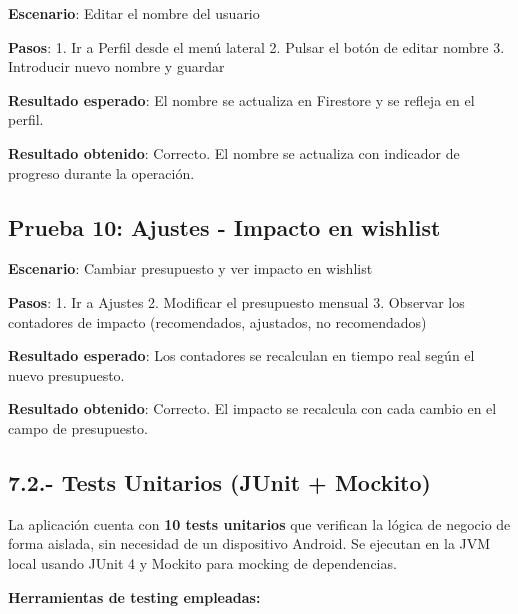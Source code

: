 \documentclass[
  spanish,
  11pt,
  paper=a4,
  ,captions=tableheading
]{scrartcl}
\begin{document}
\textbf{Escenario}: Editar el nombre del usuario

\textbf{Pasos}: 1. Ir a Perfil desde el menú lateral 2. Pulsar el botón
de editar nombre 3. Introducir nuevo nombre y guardar

\textbf{Resultado esperado}: El nombre se actualiza en Firestore y se
refleja en el perfil.

\textbf{Resultado obtenido}: Correcto. El nombre se actualiza con
indicador de progreso durante la operación.

\hypertarget{prueba-10-ajustes---impacto-en-wishlist}{%
\subsection{Prueba 10: Ajustes - Impacto en
wishlist}\label{prueba-10-ajustes---impacto-en-wishlist}}

\textbf{Escenario}: Cambiar presupuesto y ver impacto en wishlist

\textbf{Pasos}: 1. Ir a Ajustes 2. Modificar el presupuesto mensual 3.
Observar los contadores de impacto (recomendados, ajustados, no
recomendados)

\textbf{Resultado esperado}: Los contadores se recalculan en tiempo real
según el nuevo presupuesto.

\textbf{Resultado obtenido}: Correcto. El impacto se recalcula con cada
cambio en el campo de presupuesto.

\newpage

\hypertarget{tests-unitarios-junit-mockito}{%
\subsection{7.2.- Tests Unitarios (JUnit +
Mockito)}\label{tests-unitarios-junit-mockito}}

La aplicación cuenta con \textbf{10 tests unitarios} que verifican la
lógica de negocio de forma aislada, sin necesidad de un dispositivo
Android. Se ejecutan en la JVM local usando JUnit 4 y Mockito para
mocking de dependencias.

\textbf{Herramientas de testing empleadas:}
\end{document}
